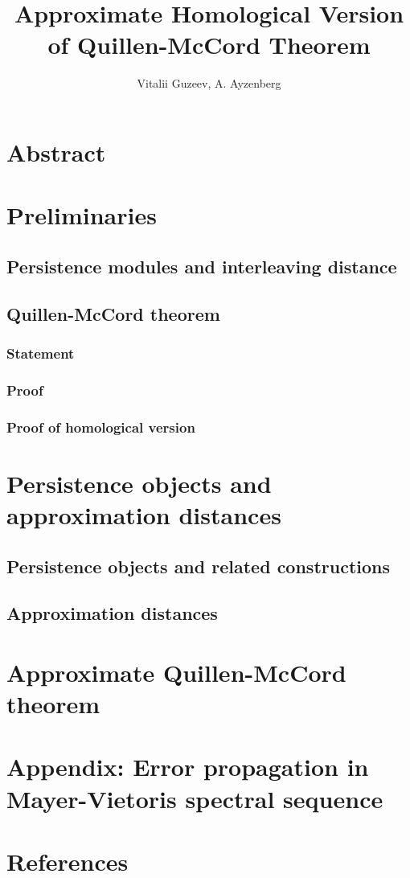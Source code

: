 \documentclass[a4paper, 12pt]{article}
\title{Approximate Homological Version of Quillen-McCord Theorem}
\author{Vitalii Guzeev, A. Ayzenberg}
\theoremstyle{definition}
\theoremstyle{remark}
\begin{document}
\section{Abstract}


\section{Preliminaries}

\subsection{Persistence modules and interleaving distance}


\subsection{Quillen-McCord theorem}

\subsubsection{Statement}


\subsubsection{Proof}


\subsubsection{Proof of homological version}


\section{Persistence objects and approximation distances}

\subsection{Persistence objects and related constructions}


\subsection{Approximation distances}


\section{Approximate Quillen-McCord theorem}


\section{Appendix: Error propagation in Mayer-Vietoris spectral sequence}


\section{References}

\end{document}

